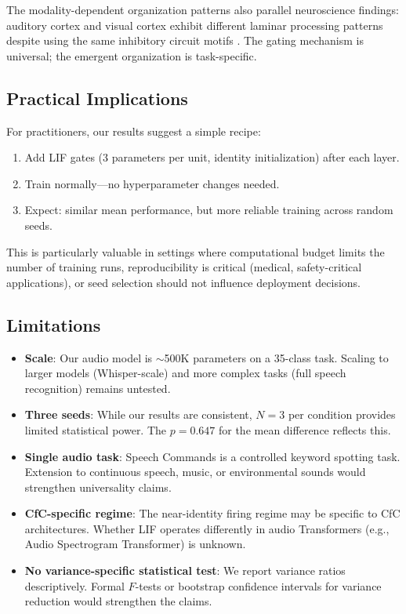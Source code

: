 \documentclass[11pt]{article}
\begin{document}
The modality-dependent organization patterns also parallel neuroscience findings: auditory cortex and visual cortex exhibit different laminar processing patterns despite using the same inhibitory circuit motifs \cite{douglas2004neuronal}. The gating mechanism is universal; the emergent organization is task-specific.

\subsection{Practical Implications}

For practitioners, our results suggest a simple recipe:
\begin{enumerate}
    \item Add LIF gates (3 parameters per unit, identity initialization) after each layer.
    \item Train normally---no hyperparameter changes needed.
    \item Expect: similar mean performance, but more reliable training across random seeds.
\end{enumerate}

This is particularly valuable in settings where computational budget limits the number of training runs, reproducibility is critical (medical, safety-critical applications), or seed selection should not influence deployment decisions.

\subsection{Limitations}

\begin{itemize}
    \item \textbf{Scale}: Our audio model is $\sim$500K parameters on a 35-class task. Scaling to larger models (Whisper-scale) and more complex tasks (full speech recognition) remains untested.
    \item \textbf{Three seeds}: While our results are consistent, $N = 3$ per condition provides limited statistical power. The $p = 0.647$ for the mean difference reflects this.
    \item \textbf{Single audio task}: Speech Commands is a controlled keyword spotting task. Extension to continuous speech, music, or environmental sounds would strengthen universality claims.
    \item \textbf{CfC-specific regime}: The near-identity firing regime may be specific to CfC architectures. Whether LIF operates differently in audio Transformers (e.g., Audio Spectrogram Transformer) is unknown.
    \item \textbf{No variance-specific statistical test}: We report variance ratios descriptively. Formal $F$-tests or bootstrap confidence intervals for variance reduction would strengthen the claims.
\end{itemize}
\end{document}
